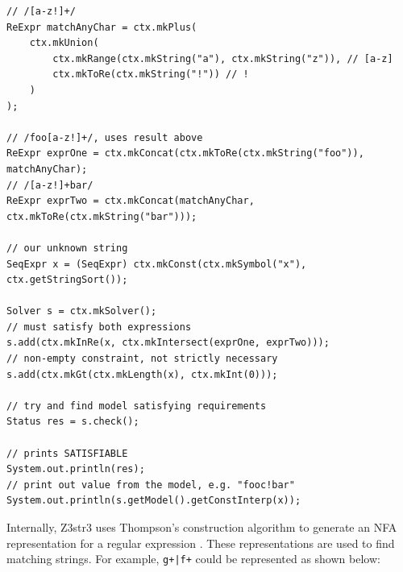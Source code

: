 \documentclass[a4paper]{article}
\begin{document}
\begin{verbatim}
// /[a-z!]+/
ReExpr matchAnyChar = ctx.mkPlus(
    ctx.mkUnion(
        ctx.mkRange(ctx.mkString("a"), ctx.mkString("z")), // [a-z]
        ctx.mkToRe(ctx.mkString("!")) // !
    )
);

// /foo[a-z!]+/, uses result above
ReExpr exprOne = ctx.mkConcat(ctx.mkToRe(ctx.mkString("foo")), matchAnyChar);
// /[a-z!]+bar/
ReExpr exprTwo = ctx.mkConcat(matchAnyChar, ctx.mkToRe(ctx.mkString("bar")));

// our unknown string
SeqExpr x = (SeqExpr) ctx.mkConst(ctx.mkSymbol("x"), ctx.getStringSort());

Solver s = ctx.mkSolver();
// must satisfy both expressions
s.add(ctx.mkInRe(x, ctx.mkIntersect(exprOne, exprTwo)));
// non-empty constraint, not strictly necessary
s.add(ctx.mkGt(ctx.mkLength(x), ctx.mkInt(0)));

// try and find model satisfying requirements
Status res = s.check();

// prints SATISFIABLE
System.out.println(res);
// print out value from the model, e.g. "fooc!bar"
System.out.println(s.getModel().getConstInterp(x));
\end{verbatim}



Internally, Z3str3 uses Thompson's construction algorithm to generate an NFA representation for a regular expression \citep{z3nfa}. These representations are used to find matching strings. For example, \texttt{g+|f+} could be represented as shown below:

\end{document}
